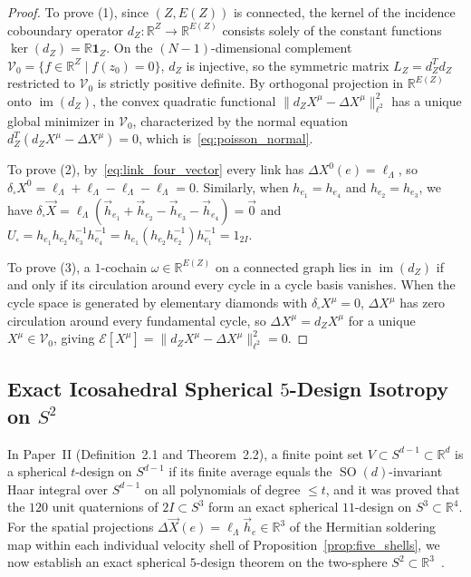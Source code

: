 \documentclass[11pt,a4paper]{article}
\theoremstyle{definition}
\theoremstyle{remark}
\newcommand{\R}{\mathbb{R}}
\newcommand{\SO}{\operatorname{SO}}
\begin{document}
\begin{proof}
To prove (1), since $(Z, E(Z))$ is connected, the kernel of the incidence coboundary operator $d_Z : \R^Z \to \R^{E(Z)}$ consists solely of the constant functions $\ker(d_Z) = \R\mathbf{1}_Z$. On the $(N-1)$-dimensional complement $\mathcal{V}_0 = \{f \in \R^Z \mid f(z_0) = 0\}$, $d_Z$ is injective, so the symmetric matrix $L_Z = d_Z^T d_Z$ restricted to $\mathcal{V}_0$ is strictly positive definite. By orthogonal projection in $\R^{E(Z)}$ onto $\operatorname{im}(d_Z)$, the convex quadratic functional $\|d_Z X^\mu - \Delta X^\mu\|_{\ell^2}^2$ has a unique global minimizer in $\mathcal{V}_0$, characterized by the normal equation $d_Z^T(d_Z X^\mu - \Delta X^\mu) = 0$, which is~\eqref{eq:poisson_normal}.

To prove (2), by~\eqref{eq:link_four_vector} every link has $\Delta X^0(e) = \ell_\Lambda$, so $\delta_\square X^0 = \ell_\Lambda + \ell_\Lambda - \ell_\Lambda - \ell_\Lambda = 0$. Similarly, when $h_{e_1} = h_{e_4}$ and $h_{e_2} = h_{e_3}$, we have $\delta_\square \vec{X} = \ell_\Lambda(\vec{h}_{e_1} + \vec{h}_{e_2} - \vec{h}_{e_3} - \vec{h}_{e_4}) = \vec{0}$ and $U_\square = h_{e_1} h_{e_2} h_{e_3}^{-1} h_{e_4}^{-1} = h_{e_1} (h_{e_2} h_{e_2}^{-1}) h_{e_1}^{-1} = 1_{2I}$.

To prove (3), a $1$-cochain $\omega \in \R^{E(Z)}$ on a connected graph lies in $\operatorname{im}(d_Z)$ if and only if its circulation around every cycle in a cycle basis vanishes. When the cycle space is generated by elementary diamonds with $\delta_\square X^\mu = 0$, $\Delta X^\mu$ has zero circulation around every fundamental cycle, so $\Delta X^\mu = d_Z X^\mu$ for a unique $X^\mu \in \mathcal{V}_0$, giving $\mathcal{E}[X^\mu] = \|d_Z X^\mu - \Delta X^\mu\|_{\ell^2}^2 = 0$.
\end{proof}

\subsection{Exact Icosahedral Spherical \texorpdfstring{$5$-Design}{5-Design} Isotropy on \texorpdfstring{$S^2$}{S\^{}2}}

In Paper~II (Definition~2.1 and Theorem~2.2), a finite point set $V \subset S^{d-1} \subset \R^d$ is a spherical $t$-design on $S^{d-1}$ if its finite average equals the $\SO(d)$-invariant Haar integral over $S^{d-1}$ on all polynomials of degree $\le t$, and it was proved that the $120$ unit quaternions of $2I \subset S^3$ form an exact spherical $11$-design on $S^3 \subset \R^4$. For the spatial projections $\Delta \vec{X}(e) = \ell_\Lambda \vec{h}_e \in \R^3$ of the Hermitian soldering map within each individual velocity shell of Proposition~\ref{prop:five_shells}, we now establish an exact spherical $5$-design theorem on the two-sphere $S^2 \subset \R^3$~\cite{DelsarteGoethalsSeidel1977}.
\end{document}
